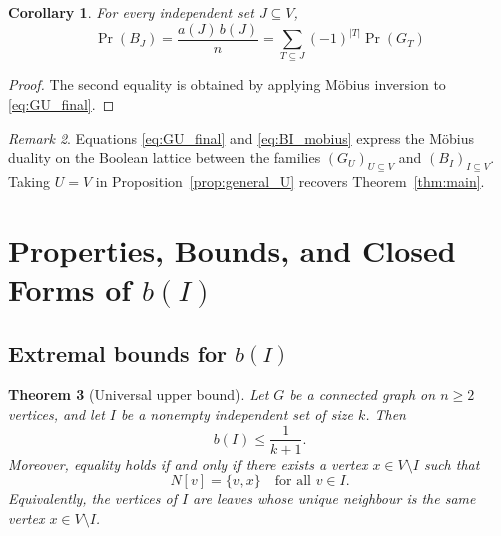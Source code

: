 \documentclass[11pt,a4paper]{article}
\numberwithin{equation}{section}
\theoremstyle{plain}
\newtheorem{theorem}{Theorem}[section]
\newtheorem{corollary}[theorem]{Corollary}
\theoremstyle{definition}
\theoremstyle{remark}
\newtheorem{remark}[theorem]{Remark}
\begin{document}
\begin{corollary}\label{cor:BI_mobius}
    For every independent set \(J\subseteq V\),
    \begin{equation}\label{eq:BI_mobius}
    \Pr(B_J)
    =
    \frac{a(J)\,b(J)}{n}
    =
    \sum_{T\subseteq J}(-1)^{|T|}\Pr(G_T)
    \end{equation}
\end{corollary}

\begin{proof}
The second equality is obtained by applying Möbius inversion to \eqref{eq:GU_final}.
\end{proof}

\begin{remark}
Equations \eqref{eq:GU_final} and \eqref{eq:BI_mobius} express the Möbius duality on the Boolean lattice between the families \((G_U)_{U\subseteq V}\) and \((B_I)_{I\subseteq V}\).  Taking \(U=V\) in Proposition~\ref{prop:general_U} recovers Theorem~\ref{thm:main}.
\end{remark}

\section{Properties, Bounds, and Closed Forms of \(b(I)\)}
\label{sec:bounds}

\subsection{Extremal bounds for \(b(I)\)}
\label{subsec:universal_bounds}

\begin{theorem}[Universal upper bound]
\label{thm:b_upper}
Let \(G\) be a connected graph on \(n\ge 2\) vertices, and let \(I\) be a nonempty independent set of size \(k\). Then
\[
b(I)\le \frac{1}{k+1}.
\]
Moreover, equality holds if and only if there exists a vertex
\(x\in V\setminus I\) such that
\[
N[v]=\{v,x\}\quad\text{for all }v\in I.
\]
Equivalently, the vertices of \(I\) are leaves whose unique neighbour is the same vertex \(x\in V\setminus I\).
\end{theorem}
\end{document}
